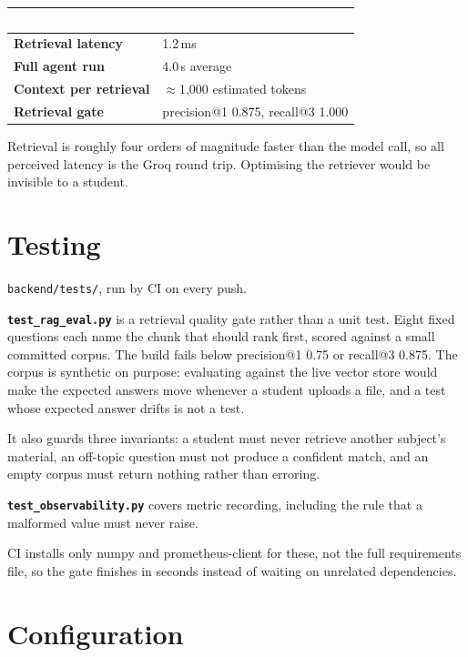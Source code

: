 \documentclass[11pt,a4paper]{article}
\newcommand{\code}[1]{\colorbox{fbCream}{\texttt{\small #1}}}
\newcommand{\hdr}[1]{\textcolor{white}{\bfseries #1}}
\begin{document}
\begin{tabularx}{\textwidth}{>{\bfseries}l L}
\toprule
{}\hdr{Measure} & \hdr{Value} \\
\midrule
Retrieval latency & 1.2\,ms \\
Full agent run & 4.0\,s average \\
Context per retrieval & $\approx$1{,}000 estimated tokens \\
Retrieval gate & precision@1 0.875, recall@3 1.000 \\
\bottomrule
\end{tabularx}

Retrieval is roughly four orders of magnitude faster than the model call, so all
perceived latency is the Groq round trip. Optimising the retriever would be
invisible to a student.

\section{Testing}

\code{backend/tests/}, run by CI on every push.

\textbf{\code{test\_rag\_eval.py}} is a retrieval quality gate rather than a unit
test. Eight fixed questions each name the chunk that should rank first, scored
against a small committed corpus. The build fails below precision@1 0.75 or
recall@3 0.875. The corpus is synthetic on purpose: evaluating against the live
vector store would make the expected answers move whenever a student uploads a
file, and a test whose expected answer drifts is not a test.

It also guards three invariants: a student must never retrieve another subject's
material, an off-topic question must not produce a confident match, and an empty
corpus must return nothing rather than erroring.

\textbf{\code{test\_observability.py}} covers metric recording, including the
rule that a malformed value must never raise.

CI installs only numpy and prometheus-client for these, not the full requirements
file, so the gate finishes in seconds instead of waiting on unrelated
dependencies.

\section{Configuration}
\end{document}
